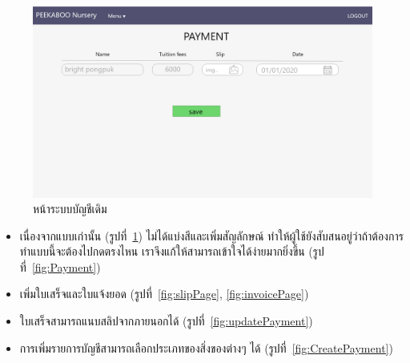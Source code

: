 \begin{figure}
  \begin{center}
    \includegraphics[width=\linewidth]{images/paymentPage.png}
  \end{center}
  \caption{หน้าระบบบัญชีเดิม}
  \label{fig:old1}
\end{figure}
\begin{itemize}
    \item เนื่องจากแบบเก่านั้น (รูปที่~\ref{fig:old1})   ไม่ได้แบ่งสีและเพิ่มสัญลักษณ์ ทำให้ผู้ใช้ยังสับสนอยู่ว่าถ้าต้องการทำแบบนี้จะต้องไปกดตรงไหน เราจึงแก้ให้สามารถเข้าใจได้ง่ายมากยิ่งขึ้น (รูปที่~\ref{fig:Payment})
    \item เพิ่มใบเสร็จและใบแจ้งยอด (รูปที่~\ref{fig:slipPage}, \ref{fig:invoicePage})
    \item ใบเสร็จสามารถแนบสลิปจากภายนอกได้ (รูปที่~\ref{fig:updatePayment})
    \item การเพิ่มรายการบัญชีสามารถเลือกประเภทของสิ่งของต่างๆ ได้ (รูปที่~\ref{fig:CreatePayment})
\end{itemize}

